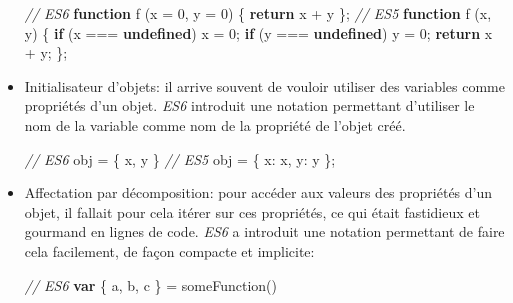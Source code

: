 \documentclass[12pt,a4paper]{article}
\newenvironment{Shaded}{}{}
\newcommand{\KeywordTok}[1]{\textcolor[rgb]{0.00,0.44,0.13}{\textbf{{#1}}}}
\newcommand{\DataTypeTok}[1]{\textcolor[rgb]{0.56,0.13,0.00}{{#1}}}
\newcommand{\DecValTok}[1]{\textcolor[rgb]{0.25,0.63,0.44}{{#1}}}
\newcommand{\CommentTok}[1]{\textcolor[rgb]{0.38,0.63,0.69}{\textit{{#1}}}}
\newcommand{\ControlFlowTok}[1]{\textcolor[rgb]{0.00,0.44,0.13}{\textbf{{#1}}}}
\newcommand{\OperatorTok}[1]{\textcolor[rgb]{0.40,0.40,0.40}{{#1}}}
\newcommand{\AttributeTok}[1]{\textcolor[rgb]{0.49,0.56,0.16}{{#1}}}
\newcommand{\NormalTok}[1]{{#1}}
\begin{document}
\begin{itemize}
  \begin{Shaded}
  \begin{Highlighting}[]
  \CommentTok{// ES6}
  \KeywordTok{function} \AttributeTok{f} \NormalTok{(x }\OperatorTok{=} \DecValTok{0}\OperatorTok{,} \NormalTok{y }\OperatorTok{=} \DecValTok{0}\NormalTok{) }\OperatorTok{\{}
      \ControlFlowTok{return} \NormalTok{x }\OperatorTok{+} \NormalTok{y}
  \OperatorTok{\};}
  \CommentTok{// ES5}
  \KeywordTok{function} \AttributeTok{f} \NormalTok{(x}\OperatorTok{,} \NormalTok{y) }\OperatorTok{\{}
      \ControlFlowTok{if} \NormalTok{(x }\OperatorTok{===} \KeywordTok{undefined}\NormalTok{)}
          \NormalTok{x }\OperatorTok{=} \DecValTok{0}\OperatorTok{;}
      \ControlFlowTok{if} \NormalTok{(y }\OperatorTok{===} \KeywordTok{undefined}\NormalTok{)}
          \NormalTok{y }\OperatorTok{=} \DecValTok{0}\OperatorTok{;}
      \ControlFlowTok{return} \NormalTok{x }\OperatorTok{+} \NormalTok{y}\OperatorTok{;}
  \OperatorTok{\};}
  \end{Highlighting}
  \end{Shaded}
  \item
    Initialisateur d'objets: il arrive souvent de vouloir utiliser des
    variables comme propriétés d'un objet. \emph{ES6} introduit une
    notation permettant d'utiliser le nom de la variable comme nom de la
    propriété de l'objet créé.

  \begin{Shaded}
  \begin{Highlighting}[]
  \CommentTok{// ES6}
  \NormalTok{obj }\OperatorTok{=} \OperatorTok{\{} \NormalTok{x}\OperatorTok{,} \NormalTok{y }\OperatorTok{\}}
  \CommentTok{// ES5}
  \NormalTok{obj }\OperatorTok{=} \OperatorTok{\{} \DataTypeTok{x}\OperatorTok{:} \NormalTok{x}\OperatorTok{,} \DataTypeTok{y}\OperatorTok{:} \NormalTok{y }\OperatorTok{\};}
  \end{Highlighting}
  \end{Shaded}
  \item
    Affectation par décomposition: pour accéder aux valeurs des propriétés
    d'un objet, il fallait pour cela itérer sur ces propriétés, ce qui
    était fastidieux et gourmand en lignes de code. \emph{ES6} a introduit
    une notation permettant de faire cela facilement, de façon compacte et
    implicite:

  \begin{Shaded}
  \begin{Highlighting}[]
  \CommentTok{// ES6}
  \KeywordTok{var} \OperatorTok{\{} \NormalTok{a}\OperatorTok{,} \NormalTok{b}\OperatorTok{,} \NormalTok{c }\OperatorTok{\}} \OperatorTok{=} \AttributeTok{someFunction}\NormalTok{()}


\end{Highlighting}
\end{Shaded}
\end{itemize}
\end{document}
